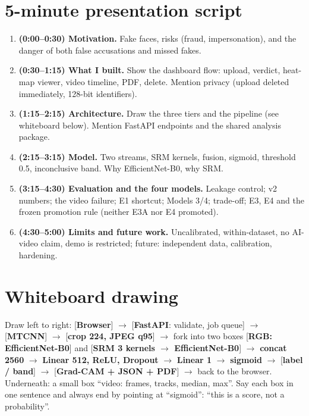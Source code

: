 \documentclass[11pt,a4paper]{report}
\begin{document}
\section{5-minute presentation script}
\begin{enumerate}
\item \textbf{(0:00--0:30) Motivation.} Fake faces, risks (fraud, impersonation), and the danger of both false accusations and missed fakes.
\item \textbf{(0:30--1:15) What I built.} Show the dashboard flow: upload, verdict, heat-map viewer, video timeline, PDF, delete. Mention privacy (upload deleted immediately, 128-bit identifiers).
\item \textbf{(1:15--2:15) Architecture.} Draw the three tiers and the pipeline (see whiteboard below). Mention FastAPI endpoints and the shared analysis package.
\item \textbf{(2:15--3:15) Model.} Two streams, SRM kernels, fusion, sigmoid, threshold 0.5, inconclusive band. Why EfficientNet-B0, why SRM.
\item \textbf{(3:15--4:30) Evaluation and the four models.} Leakage control; v2 numbers; the video failure; E1 shortcut; Models 3/4; trade-off; E3, E4 and the frozen promotion rule (neither E3A nor E4 promoted).
\item \textbf{(4:30--5:00) Limits and future work.} Uncalibrated, within-dataset, no AI-video claim, demo is restricted; future: independent data, calibration, hardening.
\end{enumerate}

\section{Whiteboard drawing}
Draw left to right: [\textbf{Browser}] $\rightarrow$ [\textbf{FastAPI}: validate, job queue] $\rightarrow$ [\textbf{MTCNN}] $\rightarrow$ [\textbf{crop 224, JPEG q95}] $\rightarrow$ fork into two boxes [\textbf{RGB: EfficientNet-B0}] and [\textbf{SRM 3 kernels $\rightarrow$ EfficientNet-B0}] $\rightarrow$ \textbf{concat 2560} $\rightarrow$ \textbf{Linear 512, ReLU, Dropout} $\rightarrow$ \textbf{Linear 1} $\rightarrow$ \textbf{sigmoid} $\rightarrow$ [\textbf{label / band}] $\rightarrow$ [\textbf{Grad-CAM + JSON + PDF}] $\rightarrow$ back to the browser. Underneath: a small box ``video: frames, tracks, median, max''.
Say each box in one sentence and always end by pointing at ``sigmoid'': ``this is a score, not a probability''.
\end{document}
